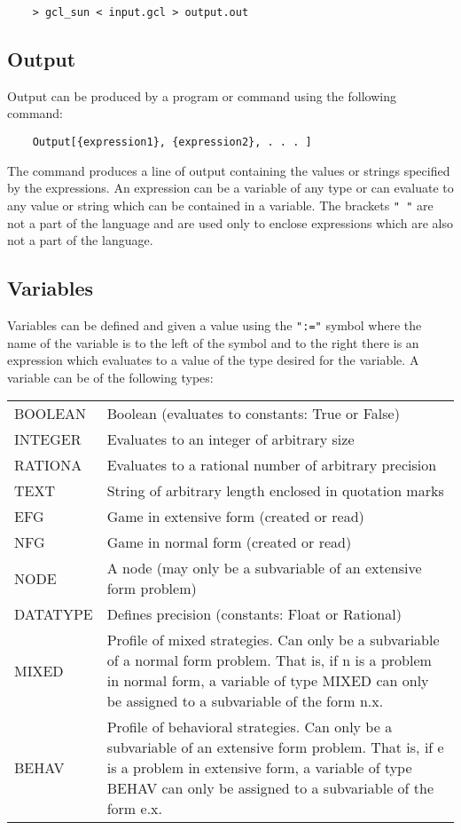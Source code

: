 \begin{verbatim}
	> gcl_sun < input.gcl > output.out
\end{verbatim}

\subsection*{Output}

Output can be produced by a program or command using the following command:

\begin{verbatim}
	Output[{expression1}, {expression2}, . . . ]
\end{verbatim}

The command produces a line of output containing the values or strings 
specified by the expressions.  An expression can be a variable of any type or 
can evaluate to any value or string which can be contained in a variable.  The 
brackets {\tt "{ }"} are not a part of the language and are used only to 
enclose expressions which are also not a part of the language.

\subsection*{Variables}

Variables can be defined and given a value using the {\tt ":="} symbol 
where the name of the variable is to the left of the symbol and to the right 
there is an expression which evaluates to a value of the type desired for 
the variable. A variable can be of the following types:

\medskip

\begin{tabular}{lp{4in}}
BOOLEAN & Boolean (evaluates to constants:  True or False)\\
INTEGER & Evaluates to an integer of arbitrary size \\
RATIONA & Evaluates to a rational number of arbitrary precision\\
TEXT	& String of arbitrary length enclosed in quotation marks\\
EFG	& Game in extensive form (created or read)\\
NFG	& Game in normal form (created or read)\\
NODE	& A node (may only be a subvariable of an extensive form
problem) \\
DATATYPE & Defines precision (constants:  Float or Rational) \\
MIXED	& {Profile of mixed strategies.  Can only be a subvariable of a
normal form problem.  That is, if n is a problem in normal form, a
variable of type MIXED can only be assigned to a subvariable of the
form n.x.}\\
BEHAV	& Profile of behavioral strategies.  Can only be a subvariable
of an extensive form problem.  That is, if e is a problem in extensive
form, a variable of type BEHAV can only be assigned to a subvariable
of the form e.x. \\
\end{tabular}

